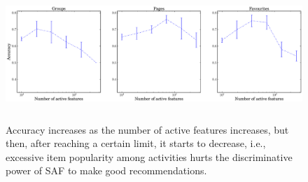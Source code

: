 \begin{figure}[tbh!]
\centering
\includegraphics[width=180mm, height=50mm]{data/newPlots/AccuracyVsActiveFeatures.eps}
\vspace{-6mm}
\caption{Accuracy increases as the number of active features increases, but then, after reaching a certain limit, it starts to decrease, i.e., excessive item popularity among activities hurts the discriminative power of SAF to make good recommendations.}
\label{fig:AccuracyVsactiveFeats}
\end{figure}
